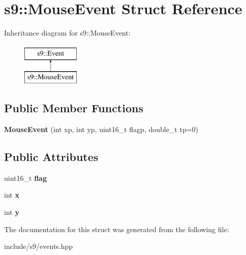 \hypertarget{structs9_1_1MouseEvent}{\section{s9\-:\-:Mouse\-Event Struct Reference}
\label{structs9_1_1MouseEvent}
}
Inheritance diagram for s9\-:\-:Mouse\-Event\-:\begin{figure}[H]
\begin{center}
\leavevmode
\includegraphics[height=2.000000cm]{structs9_1_1MouseEvent}
\end{center}
\end{figure}
\subsection*{Public Member Functions}
\begin{DoxyCompactItemize}
\item 
\hypertarget{structs9_1_1MouseEvent_a6c322745d37eff9f2630966a441864a9}{{\bfseries Mouse\-Event} (int xp, int yp, uint16\-\_\-t flagp, double\-\_\-t tp=0)}\label{structs9_1_1MouseEvent_a6c322745d37eff9f2630966a441864a9}

\end{DoxyCompactItemize}
\subsection*{Public Attributes}
\begin{DoxyCompactItemize}
\item 
\hypertarget{structs9_1_1MouseEvent_a0b106ab9a2d2accf265133ae7c586eea}{uint16\-\_\-t {\bfseries flag}}\label{structs9_1_1MouseEvent_a0b106ab9a2d2accf265133ae7c586eea}

\item 
\hypertarget{structs9_1_1MouseEvent_a75da38ef356413ed9c3d4c18a75158dc}{int {\bfseries x}}\label{structs9_1_1MouseEvent_a75da38ef356413ed9c3d4c18a75158dc}

\item 
\hypertarget{structs9_1_1MouseEvent_a485ee096b9dc3569db470172a5b8f015}{int {\bfseries y}}\label{structs9_1_1MouseEvent_a485ee096b9dc3569db470172a5b8f015}

\end{DoxyCompactItemize}


The documentation for this struct was generated from the following file\-:\begin{DoxyCompactItemize}
\item 
include/s9/events.\-hpp\end{DoxyCompactItemize}
